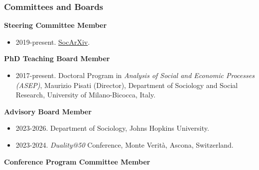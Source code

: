 \documentclass[
]{article}
\providecommand{\tightlist}{%
  \setlength{\itemsep}{0pt}\setlength{\parskip}{0pt}}
\begin{document}
\subsubsection{Committees and Boards}\label{committees-and-boards}

\textbf{Steering Committee Member}

\begin{itemize}
\tightlist
\item
  2019-present. \href{https://socopen.org/}{SocArXiv}.
\end{itemize}

\textbf{PhD Teaching Board Member}

\begin{itemize}
\tightlist
\item
  2017-present. Doctoral Program in \emph{Analysis of Social and
  Economic Processes (ASEP)}, Maurizio Pisati (Director), Department of
  Sociology and Social Research, University of Milano-Bicocca, Italy.
\end{itemize}

\textbf{Advisory Board Member}

\begin{itemize}
\tightlist
\item
  2023-2026. Department of Sociology, Johns Hopkins University.
\item
  2023-2024. \emph{Duality@50} Conference, Monte Verità, Ascona,
  Switzerland.
\end{itemize}

\textbf{Conference Program Committee Member}
\end{document}
